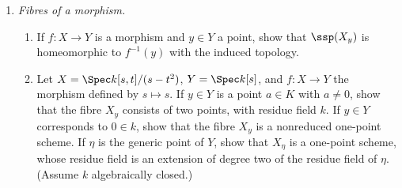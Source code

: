 \documentclass[12pt]{amsart}
\begin{document}
\begin{enumerate}
	\item[3.10.] {
      \emph{Fibres of a morphism.}
      \begin{enumerate}
        \item If $f:X\to Y$ is a morphism and $y\in Y$ a point, show that $\ssp(X_y)$ is homeomorphic to $f^{-1}(y)$ with the induced topology.
        \item Let $X=\Spec k[s,t]/(s-t^2)$, $Y=\Spec k[s]$, and $f:X\to Y$ the morphism defined by $s\mapsto s$.
          If $y\in Y$ is a point $a\in K$ with $a\neq 0$, show that the fibre $X_y$ consists of two points, with residue field $k$.
          If $y\in Y$ corresponds to $0\in k$, show that the fibre $X_y$ is a nonreduced one-point scheme.
          If $\eta$ is the generic point of $Y$, show that $X_\eta$ is a one-point scheme, whose residue field is an extension of degree two of the residue field of $\eta$. (Assume $k$ algebraically closed.)
      \end{enumerate}
    }
\end{enumerate}
\end{document}
